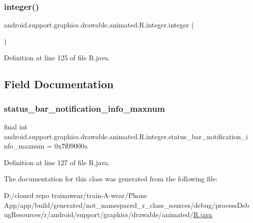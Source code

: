 \subsubsection{\texorpdfstring{integer()}{integer()}}
{\footnotesize\ttfamily android.\+support.\+graphics.\+drawable.\+animated.\+R.\+integer.\+integer (\begin{DoxyParamCaption}{ }\end{DoxyParamCaption})\hspace{0.3cm}{\ttfamily [private]}}



Definition at line 125 of file R.\+java.


\begin{DoxyCode}{0}

\end{DoxyCode}


\subsection{Field Documentation}
\mbox{\label{classandroid_1_1support_1_1graphics_1_1drawable_1_1animated_1_1_r_1_1integer_a60aefdee6a7431a6f35a15a0bb57537b}} 
\subsubsection{\texorpdfstring{status\_bar\_notification\_info\_maxnum}{status\_bar\_notification\_info\_maxnum}}
{\footnotesize\ttfamily final int android.\+support.\+graphics.\+drawable.\+animated.\+R.\+integer.\+status\+\_\+bar\+\_\+notification\+\_\+info\+\_\+maxnum = 0x7f09000a\hspace{0.3cm}{\ttfamily [static]}}



Definition at line 127 of file R.\+java.



The documentation for this class was generated from the following file\+:\begin{DoxyCompactItemize}
\item 
D\+:/cloned repo trainawear/train-\/\+A-\/wear/\+Phone App/app/build/generated/not\+\_\+namespaced\+\_\+r\+\_\+class\+\_\+sources/debug/process\+Debug\+Resources/r/android/support/graphics/drawable/animated/\mbox{\hyperlink{process_debug_resources_2r_2android_2support_2graphics_2drawable_2animated_2_r_8java}{R.\+java}}\end{DoxyCompactItemize}
